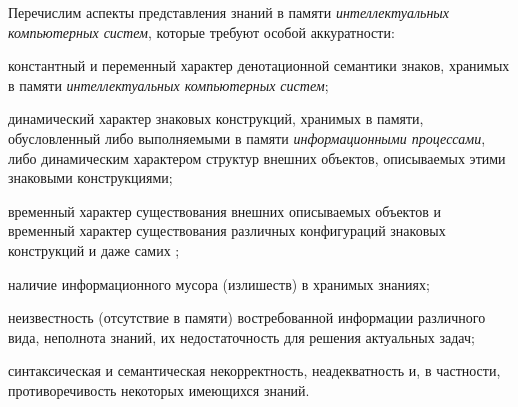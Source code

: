 \begin{comment}
Типология \textit{sc-конструкций} с точки зрения \textit{Денотационной семантики и Синтаксиса SC-кода} выглядит следующим образом

\begin{SCn}
	\scnheader{sc-множество}
	\scnidtf{\textit{sc-конструкция}}
	\scnidtf{информационная конструкция, принадлежащая \textit{SC-коду}}
	\scnsuperset{sc-структура}
	\begin{scnindent}
		\scnsuperset{sc-текст}
		\begin{scnindent}
			\scnidtftext{часто используемый sc-идентификатор}{\textit{SC-код}}
			\begin{scnindent}
				\scniselement{имя собственное}
			\end{scnindent} 
			\scnidtf{синтаксически целостная и синтаксически корректная (правильно построенная) информационная конструкция SC-кода}
			\scnidtf{Класс (Множество всевозможных) sc-текстов}
			\scnsuperset{sc-знание}
			\begin{scnindent}
				\scnidtf{семантически целостный и семантически корректный \textit{sc-текст}, являющийся адекватным фрагментом соответствующей \textit{предметной области} или ее спецификации (онтологии)}
			\end{scnindent} 
		\end{scnindent} 
	\end{scnindent} 
\end{SCn}

\end{comment}

Перечислим аспекты представления знаний в памяти \textit{интеллектуальных компьютерных систем}, которые требуют особой аккуратности:
\begin{textitemize}
	\item константный и переменный характер денотационной семантики знаков, хранимых в памяти \textit{интеллектуальных компьютерных систем};
	\item динамический характер знаковых конструкций, хранимых в памяти, обусловленный либо выполняемыми в памяти \textit{информационными процессами}, либо динамическим характером структур внешних объектов, описываемых этими знаковыми конструкциями;
	\item временный характер существования внешних описываемых объектов и временный характер существования различных конфигураций знаковых конструкций и даже самих ;
	\item наличие информационного мусора (излишеств) в хранимых знаниях;
	\item неизвестность (отсутствие в памяти) востребованной информации различного вида, неполнота знаний, их недостаточность для решения актуальных задач;
	\item синтаксическая и семантическая некорректность, неадекватность и,  в частности, противоречивость некоторых имеющихся знаний.
\end{textitemize}

